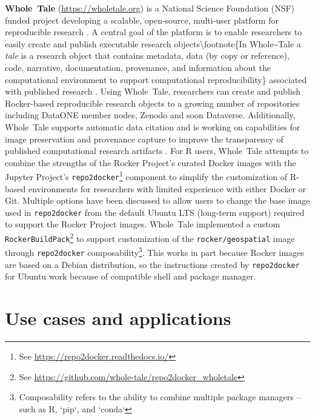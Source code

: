 \textbf{Whole~Tale} (\url{https://wholetale.org}) is a National Science
Foundation (NSF) funded project developing a scalable, open-source,
multi-user platform for reproducible research
\citep{brinckman2019, chard2019a}. A central goal of the platform is to
enable researchers to easily create and publish executable research
objects\textbackslash{}footnote\{In Whole\textasciitilde{}Tale a
\emph{tale} is a research object that contains metadata, data (by copy
or reference), code, narrative, documentation, provenance, and
information about the computational environment to support computational
reproducibility\} associated with published research \citep{chard2019b}.
Using Whole~Tale, researchers can create and publish Rocker-based
reproducible research objects to a growing number of repositories
including DataONE member nodes, Zenodo and soon Dataverse. Additionally,
Whole~Tale supports automatic data citation and is working on
capabilities for image preservation and provenance capture to improve
the transparency of published computational research artifacts
\citep{mecum2018, mcphillips2019}. For R users, Whole~Tale attempts to
combine the strengths of the Rocker Project's curated Docker images with
the Jupyter Project's
\texttt{repo2docker}\footnote{See \href{https://repo2docker.readthedocs.io/}{https://repo2docker.readthedocs.io/}}
component to simplify the customization of R-based environments for
researchers with limited experience with either Docker or Git. Multiple
options have been discussed to allow users to change the base image used
in \texttt{repo2docker} from the default Ubuntu LTS (long-term support)
required to support the Rocker Project images. Whole~Tale implemented a
custom
\texttt{RockerBuildPack}\footnote{See \href{https://github.com/whole-tale/repo2docker\_wholetale}{https://github.com/whole-tale/repo2docker\_wholetale}}
to support customization of the \texttt{rocker/geospatial} image through
\texttt{repo2docker}
composability\footnote{Composability refers to the ability to combine multiple package managers -- such as R, `pip`, and `conda`}.
This works in part because Rocker images are based on a Debian
distribution, so the instructions created by \texttt{repo2docker} for
Ubuntu work because of compatible shell and package manager.

\hypertarget{use-cases-and-applications}{%
\section{Use cases and applications}\label{use-cases-and-applications}}

